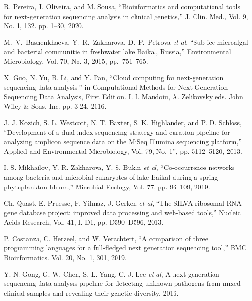 \documentclass[a4paper]{jpconf}
\begin{document}
\begin{thebibliography}{00}

 R. Pereira, J. Oliveira, and M. Sousa, ``Bioinformatics and computational tools for next-generation sequencing analysis in clinical genetics,'' J. Clin. Med., Vol. 9, No. 1, 132. pp. 1--30, 2020. 

 M.~V.~Bashenkhaeva, Y.~R.~Zakharova, D.~P.~Petrova \emph{et al}, ``Sub-ice microalgal and bacterial communitie in freshwater lake Baikal, Russia,'' Environmental Microbiology, Vol. 70, No. 3, 2015, pp.~751--765. 

 X. Guo, N. Yu, B. Li, and Y. Pan, ``Cloud computing for next-generation sequencing data analysis,'' in Computational Methods for Next Generation Sequencing Data Analysis, First Edition. I. I. Mandoiu, A. Zelikovsky eds. John Wiley \& Sons, Inc. pp. 3-24, 2016. \doi{}

 J. J. Kozich, S. L. Westcott, N. T. Baxter, S. K. Highlander, and P. D. Schloss, ``Development of a dual-index sequencing strategy and curation pipeline for analyzing amplicon sequence data on the MiSeq Illumina sequencing platform,'' Applied and Environmental Microbiology, Vol. 79, No. 17, pp. 5112–5120, 2013.

 I. S. Mikhailov, Y. R. Zakharova, Y. S. Bukin \emph{et al}, ``Co-occurrence networks among bacteria and microbial eukaryotes of lake Baikal during a spring phytoplankton bloom,'' Microbial Ecology, Vol. 77, pp. 96–109, 2019. 

 Ch. Quast, E. Pruesse, P. Yilmaz, J. Gerken \emph{et al}, ``The SILVA ribosomal RNA gene database project: improved data processing and web-based tools,'' Nucleic Acids Research, Vol. 41, I. D1, pp. D590–D596, 2013. 

 P. Costanza, C. Herzeel, and W. Verachtert, ``A comparison of three
programming languages for a full-fledged next generation sequencing tool,'' BMC Bioinformatics. Vol. 20, No. 1, 301, 2019. 

 Y.-N. Gong, G.-W. Chen, S.-L. Yang, C.-J. Lee \emph{et al}, A next-generation sequencing data analysis pipeline for detecting unknown pathogens from mixed clinical samples and revealing their genetic diversity. 2016. 


\end{thebibliography}
\end{document}
